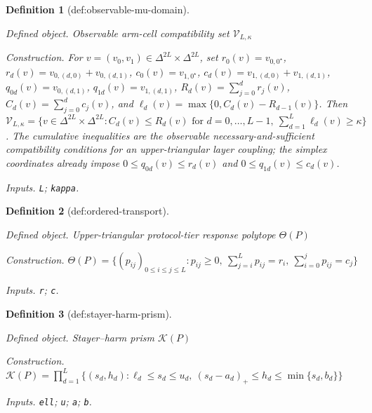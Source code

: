 \documentclass{article}
\newtheorem{definition}{Definition}
\begin{document}
\begin{definition}[def:observable-mu-domain]\label{def:observable-mu-domain}
\par\smallskip\noindent\emph{Defined object.} Observable arm-cell compatibility set \(\mathcal V_{L,\kappa}\)
\par\smallskip\noindent\emph{Construction.} For \(v=(v_0,v_1)\in\Delta^{2L}\times\Delta^{2L}\), set \(r_0(v)=v_{0,0^{\star}}\), \(r_d(v)=v_{0,(d,0)}+v_{0,(d,1)}\), \(c_0(v)=v_{1,0^{\star}}\), \(c_d(v)=v_{1,(d,0)}+v_{1,(d,1)}\), \(q_{0d}(v)=v_{0,(d,1)}\), \(q_{1d}(v)=v_{1,(d,1)}\), \(R_d(v)=\sum_{j=0}^{d}r_j(v)\), \(C_d(v)=\sum_{j=0}^{d}c_j(v)\), and \(\ell_d(v)=\max\{0,C_d(v)-R_{d-1}(v)\}\). Then \(\mathcal V_{L,\kappa}=\{v\in\Delta^{2L}\times\Delta^{2L}:C_d(v)\le R_d(v)\text{ for }d=0,\ldots,L-1,\ \sum_{d=1}^{L}\ell_d(v)\ge\kappa\}\). The cumulative inequalities are the observable necessary-and-sufficient compatibility conditions for an upper-triangular layer coupling; the simplex coordinates already impose \(0\le q_{0d}(v)\le r_d(v)\) and \(0\le q_{1d}(v)\le c_d(v)\).
\par\smallskip\noindent\emph{Inputs.} \texttt{L}; \texttt{kappa}.
\end{definition}

\begin{definition}[def:ordered-transport]\label{def:ordered-transport}
\par\smallskip\noindent\emph{Defined object.} Upper-triangular protocol-tier response polytope \(\Theta(P)\)
\par\smallskip\noindent\emph{Construction.} \(\Theta(P)=\{(p_{ij})_{0\le i\le j\le L}:p_{ij}\ge0,\ \sum_{j=i}^{L}p_{ij}=r_i,\ \sum_{i=0}^{j}p_{ij}=c_j\}\)
\par\smallskip\noindent\emph{Inputs.} \texttt{r}; \texttt{c}.
\end{definition}

\begin{definition}[def:stayer-harm-prism]\label{def:stayer-harm-prism}
\par\smallskip\noindent\emph{Defined object.} Stayer--harm prism \(\mathcal K(P)\)
\par\smallskip\noindent\emph{Construction.} \(\mathcal K(P)=\prod_{d=1}^{L}\{(s_d,h_d):\ell_d\le s_d\le u_d,\ (s_d-a_d)_+\le h_d\le\min\{s_d,b_d\}\}\)
\par\smallskip\noindent\emph{Inputs.} \texttt{ell}; \texttt{u}; \texttt{a}; \texttt{b}.
\end{definition}
\end{document}
